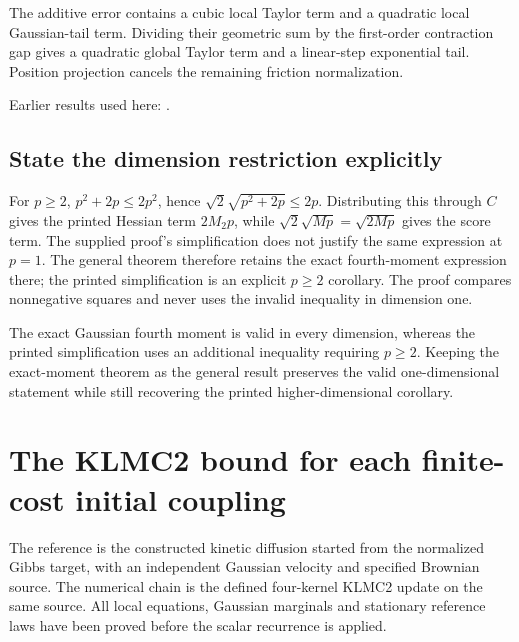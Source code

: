 \documentclass[11pt,a4paper]{report}
\begin{document}
The additive error contains a cubic local Taylor term and a quadratic local Gaussian-tail term. Dividing their geometric sum by the first-order contraction gap gives a quadratic global Taylor term and a linear-step exponential tail. Position projection cancels the remaining friction normalization.



Earlier results used here: \cite[Section~3.15.3]{LangevinLean2026ULASC}.
\subsection{\texorpdfstring{State the dimension restriction explicitly}{State the dimension restriction explicitly}}
\label{report-step-KineticLangevin-SecondOrderRecurrence-lean-3}


For \(p\ge2\), \(p^2+2p\le2p^2\), hence \(\sqrt2\sqrt{p^2+2p}\le2p\). Distributing this through \(C\) gives the printed Hessian term \(2M_2p\), while \(\sqrt2\sqrt{Mp}=\sqrt{2Mp}\) gives the score term. The supplied proof’s simplification does not justify the same expression at \(p=1\). The general theorem therefore retains the exact fourth-moment expression there; the printed simplification is an explicit \(p\ge2\) corollary. The proof compares nonnegative squares and never uses the invalid inequality in dimension one.



The exact Gaussian fourth moment is valid in every dimension, whereas the printed simplification uses an additional inequality requiring \(p\ge2\). Keeping the exact-moment theorem as the general result preserves the valid one-dimensional statement while still recovering the printed higher-dimensional corollary.

\section{\texorpdfstring{The KLMC2 bound for each finite-cost initial coupling}{The KLMC2 bound for each finite-cost initial coupling}}
\label{proof-module-KineticLangevin-CanonicalKLMC2Bound-lean}


The reference is the constructed kinetic diffusion started from the normalized Gibbs target, with an independent Gaussian velocity and specified Brownian source. The numerical chain is the defined four-kernel KLMC2 update on the same source. All local equations, Gaussian marginals and stationary reference laws have been proved before the scalar recurrence is applied.
\end{document}
